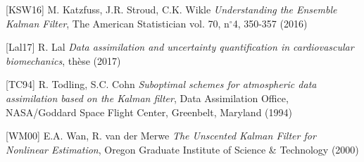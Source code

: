 \documentclass[a4paper]{article}
\newcounter{c}
\newcounter{d}
\newcounter{r}
\newcounter{e}
\begin{document}
[KSW16] M. Katzfuss, J.R. Stroud, C.K. Wikle \emph{Understanding the Ensemble Kalman Filter}, The American Statistician vol. 70, n$^\circ$4, 350-357 (2016)


[Lal17] R. Lal \emph{Data assimilation and uncertainty quantification in cardiovascular biomechanics}, thèse (2017)


[TC94] R. Todling, S.C. Cohn \emph{Suboptimal schemes for atmospheric data assimilation based on the Kalman filter}, Data Assimilation Office, NASA/Goddard Space Flight Center, Greenbelt, Maryland (1994)


[WM00] E.A. Wan, R. van der Merwe \emph{The Unscented Kalman Filter for Nonlinear Estimation},  Oregon Graduate Institute of Science \& Technology (2000)
\end{document}
